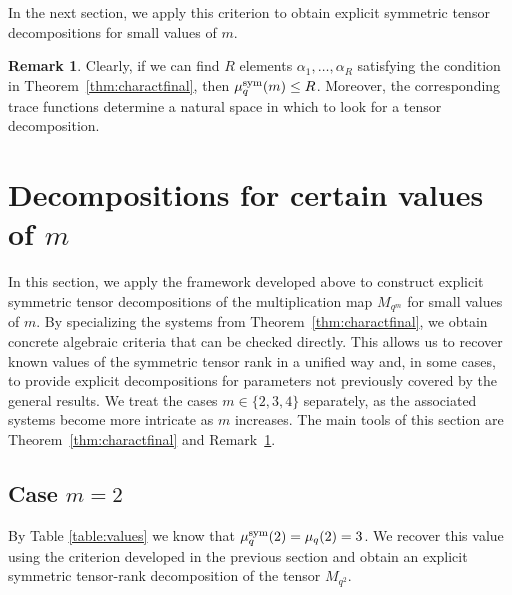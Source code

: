 \documentclass[11pt,a4paper,reqno]{article}
\numberwithin{equation}{section}
\theoremstyle{definition}
\newtheorem{remark}[theorem]{Remark}
\def\sym{\textup{sym}}
\begin{document}
In the next section, we apply this criterion to obtain explicit symmetric tensor decompositions for small values of \(m\).

\begin{remark}\label{rem:<=Rfinal}
Clearly, if we can find \(R\) elements \(\alpha_1,\ldots,\alpha_R\) satisfying the condition in Theorem~\ref{thm:charactfinal}, then
\(\mu_q^{\sym}(m)\leq R\). Moreover, the corresponding trace functions determine a
natural space in which to look for a tensor decomposition.
\end{remark}


\section{Decompositions for certain values of $m$}\label{sec:4}

In this section, we apply the framework developed above to construct explicit
symmetric tensor decompositions of the multiplication map \(M_{q^m}\) for small
values of \(m\). By specializing the systems from Theorem~\ref{thm:charactfinal},
we obtain concrete algebraic criteria that can be checked directly. This allows us to recover known values of the symmetric tensor rank in a unified
way and, in some cases, to provide explicit decompositions for parameters not previously covered by the general results. We treat the cases
\(m\in\{2,3,4\}\) separately, as the associated systems become more intricate
as \(m\) increases. The main tools of this section are Theorem~\ref{thm:charactfinal} and Remark~\ref{rem:<=Rfinal}.

\subsection{ Case $m=2$}


By Table \ref{table:values} we know that $\mu_q^{\sym}(2)=\mu_q(2)=3$. We recover this value using the criterion developed in the previous section and obtain
an explicit symmetric tensor-rank decomposition of the tensor \(M_{q^2}\).
\end{document}
